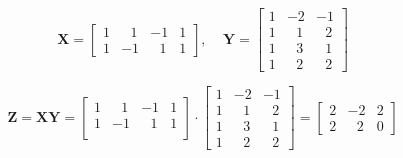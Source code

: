 \documentclass[
  11pt,
]{krantz}
\newenvironment{Shaded}{\begin{snugshade}}{\end{snugshade}}
\newcommand{\DataTypeTok}[1]{\textcolor[rgb]{0.27,0.27,0.27}{#1}}
\newcommand{\DecValTok}[1]{\textcolor[rgb]{0.06,0.06,0.06}{#1}}
\newcommand{\KeywordTok}[1]{\textcolor[rgb]{0.27,0.27,0.27}{\textbf{#1}}}
\newcommand{\NormalTok}[1]{#1}
\newcommand{\OperatorTok}[1]{\textcolor[rgb]{0.43,0.43,0.43}{\textbf{#1}}}
\newcommand{\StringTok}[1]{\textcolor[rgb]{0.5,0.5,0.5}{#1}}
\begin{document}
\[
\mathrm{\mathbf X}=
\begin{bmatrix}
1 &~~~ 1 &   -1 & 1 \\
1 &   -1 &~~~ 1 & 1
\end{bmatrix}, ~~~~~
\mathrm{\mathbf{Y}}=
\begin{bmatrix}
1 &  -2 &  -1 \\
1 &~~~1 &~~~2 \\
1 &~~~3 &~~~1 \\
1 &~~~2 &~~~2
\end{bmatrix}
\]

\[
\mathrm{\mathbf{Z}} = \mathrm{\mathbf{X}}\mathrm{\mathbf{Y}} = 
\begin{bmatrix}
1 &~~~ 1 &   -1 & 1 \\
1 &   -1 &~~~ 1 & 1 \\ 
\end{bmatrix} \cdot  
\begin{bmatrix}
1 &  -2 &  -1 \\
1 &~~~1 &~~~2 \\ 
1 &~~~3 &~~~1 \\
1 &~~~2 &~~~2 
\end{bmatrix} 
 = 
\begin{bmatrix}
2  &  -2 & 2 \\
2  &~~~2 & 0 
\end{bmatrix}
\]

\footnotesize

\begin{Shaded}
\end{Shaded}
\end{document}
